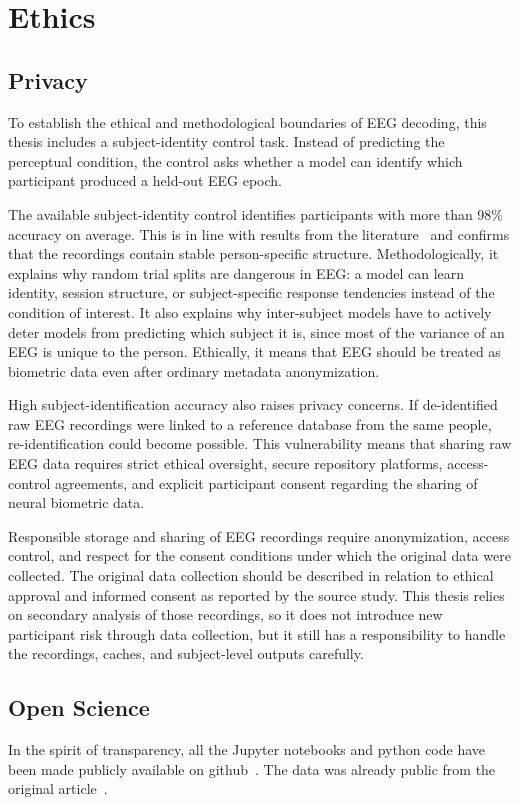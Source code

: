 \documentclass[11pt,a4paper,chapterprefix=false,parskip=false]{scrreprt}
\begin{document}
\chapter{Ethics}
\label{chap:ethics}

\section{Privacy}
To establish the ethical and methodological boundaries of EEG decoding, this thesis includes a subject-identity control task. Instead of predicting the perceptual condition, the control asks whether a model can identify which participant produced a held-out EEG epoch.

The available subject-identity control identifies participants with more than 98\% accuracy on average. This is in line with results from the literature~\cite{jijomon_person-identification_2021} and confirms that the recordings contain stable person-specific structure. Methodologically, it explains why random trial splits are dangerous in EEG: a model can learn identity, session structure, or subject-specific response tendencies instead of the condition of interest. It also explains why inter-subject models have to actively deter models from predicting which subject it is, since most of the variance of an EEG is unique to the person. Ethically, it means that EEG should be treated as biometric data even after ordinary metadata anonymization.

High subject-identification accuracy also raises privacy concerns. If de-identified raw EEG recordings were linked to a reference database from the same people, re-identification could become possible. This vulnerability means that sharing raw EEG data requires strict ethical oversight, secure repository platforms, access-control agreements, and explicit participant consent regarding the sharing of neural biometric data.

Responsible storage and sharing of EEG recordings require anonymization, access control, and respect for the consent conditions under which the original data were collected. The original data collection should be described in relation to ethical approval and informed consent as reported by the source study. This thesis relies on secondary analysis of those recordings, so it does not introduce new participant risk through data collection, but it still has a responsibility to handle the recordings, caches, and subject-level outputs carefully.

\section{Open Science}
In the spirit of transparency, all the Jupyter notebooks and python code have been made publicly available on github~\cite{noauthor_nilsdurantfg_nodate}. The data was already public from the original article~\cite{torralba_cuello_evaluating_2025, drew_binocular_2026}.
\end{document}
